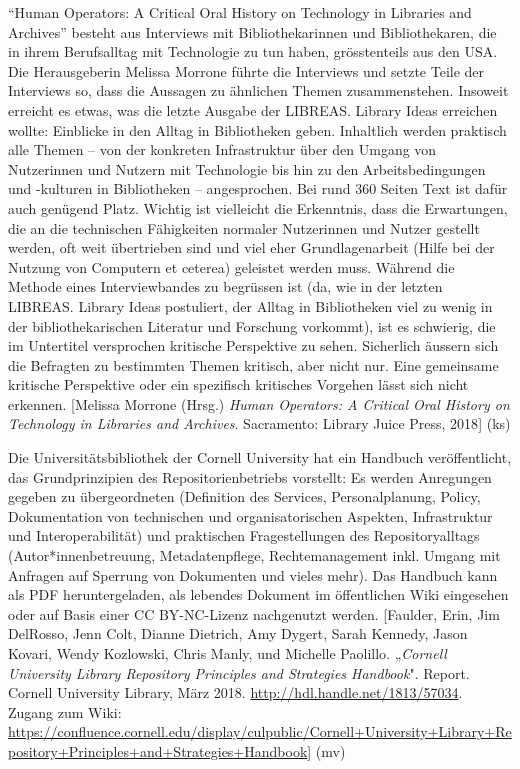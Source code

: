 \documentclass[a4paper,
fontsize=11pt,
oneside,
numbers=noperiodatend,
parskip=half-,
bibliography=totoc,
final
]{scrartcl}
\begin{document}
\enquote{Human Operators: A Critical Oral History on Technology in
Libraries and Archives} besteht aus Interviews mit Bibliothekarinnen und
Bibliothekaren, die in ihrem Berufsalltag mit Technologie zu tun haben,
grösstenteils aus den USA. Die Herausgeberin Melissa Morrone führte die
Interviews und setzte Teile der Interviews so, dass die Aussagen zu
ähnlichen Themen zusammenstehen. Insoweit erreicht es etwas, was die
letzte Ausgabe der LIBREAS. Library Ideas erreichen wollte: Einblicke in
den Alltag in Bibliotheken geben. Inhaltlich werden praktisch alle
Themen -- von der konkreten Infrastruktur über den Umgang von
Nutzerinnen und Nutzern mit Technologie bis hin zu den
Arbeitsbedingungen und -kulturen in Bibliotheken -- angesprochen. Bei
rund 360 Seiten Text ist dafür auch genügend Platz. Wichtig ist
vielleicht die Erkenntnis, dass die Erwartungen, die an die technischen
Fähigkeiten normaler Nutzerinnen und Nutzer gestellt werden, oft weit
übertrieben sind und viel eher Grundlagenarbeit (Hilfe bei der Nutzung
von Computern et ceterea) geleistet werden muss. Während die Methode
eines Interviewbandes zu begrüssen ist (da, wie in der letzten LIBREAS.
Library Ideas postuliert, der Alltag in Bibliotheken viel zu wenig in
der bibliothekarischen Literatur und Forschung vorkommt), ist es
schwierig, die im Untertitel versprochen kritische Perspektive zu sehen.
Sicherlich äussern sich die Befragten zu bestimmten Themen kritisch,
aber nicht nur. Eine gemeinsame kritische Perspektive oder ein
spezifisch kritisches Vorgehen lässt sich nicht erkennen. {[}Melissa
Morrone (Hrsg.) \emph{Human Operators: A Critical Oral History on
Technology in Libraries and Archives}. Sacramento: Library Juice Press,
2018{]} (ks)

Die Universitätsbibliothek der Cornell University hat ein Handbuch
veröffentlicht, das Grundprinzipien des Repositorienbetriebs vorstellt:
Es werden Anregungen gegeben zu übergeordneten (Definition des Services,
Personalplanung, Policy, Dokumentation von technischen und
organisatorischen Aspekten, Infrastruktur und Interoperabilität) und
praktischen Fragestellungen des Repositoryalltags (Autor*innenbetreuung,
Metadatenpflege, Rechtemanagement inkl. Umgang mit Anfragen auf Sperrung
von Dokumenten und vieles mehr). Das Handbuch kann als PDF
heruntergeladen, als lebendes Dokument im öffentlichen Wiki eingesehen
oder auf Basis einer CC BY-NC-Lizenz nachgenutzt werden. {[}Faulder,
Erin, Jim DelRosso, Jenn Colt, Dianne Dietrich, Amy Dygert, Sarah
Kennedy, Jason Kovari, Wendy Kozlowski, Chris Manly, und Michelle
Paolillo. „\emph{Cornell University Library Repository Principles and
Strategies Handbook}". Report. Cornell University Library, März 2018.
\url{http://hdl.handle.net/1813/57034}. Zugang zum Wiki:
\url{https://confluence.cornell.edu/display/culpublic/Cornell+University+Library+Repository+Principles+and+Strategies+Handbook}{]}
(mv)
\end{document}

